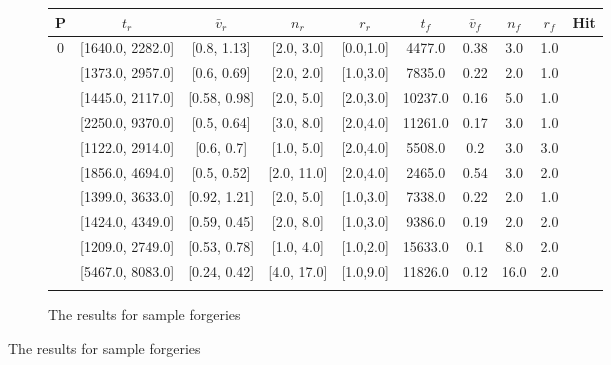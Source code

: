 \documentclass[a4paper, oneside]{csthesis}
\newcommand{\xmark}{\ding{55}}%
\begin{document}
\begin{figure}
    \begin{subfigure}[b]{\textwidth}
            \centering
            \tabcolsep 4pt
            \small
            \begin{tabular}{c|cccc||cccc||c}
            \hline
            \textbf{P} & $t_r$ & $\bar{v}_r$ & $n_r$ & $r_r$ & $t_f$ & $\bar{v}_f$ & $n_f$ & $r_f$ & Hit \\
            \hline
            0 & [1640.0, 2282.0] & [0.8, 1.13] & [2.0, 3.0] & [0.0,1.0] & 4477.0 & 0.38 & 3.0 & 1.0 & \xmark \\ \hdashline[0.5pt/3pt]
            1 & [1373.0, 2957.0] & [0.6, 0.69] & [2.0, 2.0] & [1.0,3.0] & 7835.0 & 0.22 & 2.0 & 1.0 & \xmark \\ \hdashline[0.5pt/3pt]
            2 & [1445.0, 2117.0] & [0.58, 0.98] & [2.0, 5.0] & [2.0,3.0] & 10237.0 & 0.16 & 5.0 & 1.0 & \xmark \\ \hdashline[0.5pt/3pt]
            3 & [2250.0, 9370.0] & [0.5, 0.64] & [3.0, 8.0] & [2.0,4.0] & 11261.0 & 0.17 & 3.0 & 1.0 & \xmark \\ \hdashline[0.5pt/3pt]
            4 & [1122.0, 2914.0] & [0.6, 0.7] & [1.0, 5.0] & [2.0,4.0] & 5508.0 & 0.2 & 3.0 & 3.0 & \xmark \\ \hdashline[0.5pt/3pt]
            5 & [1856.0, 4694.0] & [0.5, 0.52] & [2.0, 11.0] & [2.0,4.0] & 2465.0 & 0.54 & 3.0 & 2.0 & \xmark \\ \hdashline[0.5pt/3pt]
            6 & [1399.0, 3633.0] & [0.92, 1.21] & [2.0, 5.0] & [1.0,3.0] & 7338.0 & 0.22 & 2.0 & 1.0 & \xmark \\ \hdashline[0.5pt/3pt]
            7 & [1424.0, 4349.0] & [0.59, 0.45] & [2.0, 8.0] & [1.0,3.0] & 9386.0 & 0.19 & 2.0 & 2.0 & \xmark \\ \hdashline[0.5pt/3pt]
            8 & [1209.0, 2749.0] & [0.53, 0.78] & [1.0, 4.0] & [1.0,2.0] & 15633.0 & 0.1 & 8.0 & 2.0 & \xmark \\ \hdashline[0.5pt/3pt]
            9 & [5467.0, 8083.0] & [0.24, 0.42] & [4.0, 17.0] & [1.0,9.0] & 11826.0 & 0.12 & 16.0 & 2.0 & \xmark \\ \hdashline[0.5pt/3pt]
            \hline
            \end{tabular}
            \label{tbl:global-features-forg-sample}
            \caption{The results for sample forgeries}
    \end{subfigure}%


\end{figure}
\end{document}
